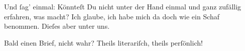\pstart
           Und{ }ſag’ einmal: Könnteſt Du nicht unter der Hand einmal und ganz zufällig
                  erfahren, was \label{K_L02704-18v}\label{K_L02704-18} macht?
                  Ich glaube, ich habe mich da doch wie ein Schaf benommen. Dieſes aber unter
                  uns.\pend
           
\pstart
           Bald einen Brief, nicht wahr? Theils literariſch, theils perſönlich!\pend
           \endnumbering{}  \newcommand{\dateiname}{L02704}\newcommand{\titel}{Paul Goldmann an Arthur Schnitzler, 24. 12. [1892]}\newcommand{\editorInnen}{Martin Anton Müller und Laura Untner}
